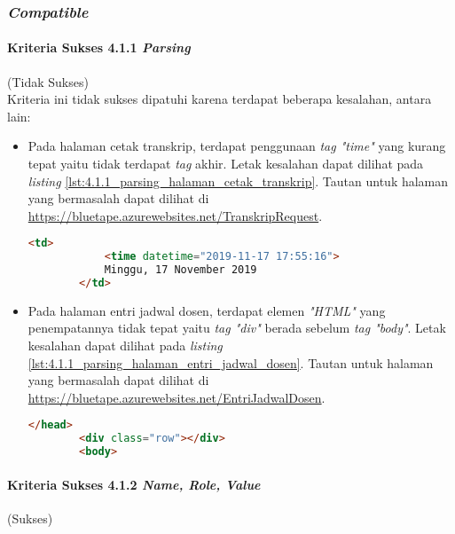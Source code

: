 \subsubsection{\textit{Compatible}}
\label{subsubsec:kepatuhan_bluetape_compatible}

\paragraph{Kriteria Sukses 4.1.1 \textit{Parsing}}
\label{par:kepatuhan_bluetape_kriteria_sukses_4.1.1}
(Tidak Sukses)\\

Kriteria ini tidak sukses dipatuhi karena terdapat beberapa kesalahan, antara lain:

\begin{itemize}
    \item Pada halaman cetak transkrip, terdapat penggunaan \textit{tag "time"} yang kurang tepat yaitu tidak terdapat \textit{tag} akhir. Letak kesalahan dapat dilihat pada \textit{listing} \ref{lst:4.1.1_parsing_halaman_cetak_transkrip}. Tautan untuk halaman yang bermasalah dapat dilihat di \url{https://bluetape.azurewebsites.net/TranskripRequest}.
    \begin{lstlisting}[frame=single, label={lst:4.1.1_parsing_halaman_cetak_transkrip}, language=HTML, caption=Kriteria Sukses 4.1.1 - Kesalahan Elemen pada Halaman Cetak Transkrip]
        <td>
            <time datetime="2019-11-17 17:55:16">
            Minggu, 17 November 2019
        </td>
    \end{lstlisting}

    \item Pada halaman entri jadwal dosen, terdapat elemen \textit{"HTML"} yang penempatannya tidak tepat yaitu \textit{tag "div"} berada sebelum \textit{tag "body"}. Letak kesalahan dapat dilihat pada \textit{listing} \ref{lst:4.1.1_parsing_halaman_entri_jadwal_dosen}. Tautan untuk halaman yang bermasalah dapat dilihat di \url{https://bluetape.azurewebsites.net/EntriJadwalDosen}.
    \begin{lstlisting}[frame=single, label={lst:4.1.1_parsing_halaman_entri_jadwal_dosen}, language=HTML, caption=Kriteria Sukses 4.1.1 - Kesalahan Elemen pada Halaman Entri Jadwal Dosen]
        </head>
        <div class="row"></div>        
        <body>
    \end{lstlisting}
\end{itemize}

\paragraph{Kriteria Sukses 4.1.2 \textit{Name, Role, Value}}
\label{par:kepatuhan_bluetape_kriteria_sukses_4.1.2}
(Sukses)\\

